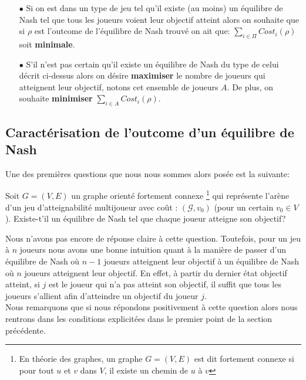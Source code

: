 \begin{itemize}
	\item[$\bullet$] Si on est dans un type de jeu tel qu'il existe (au moins) un équilibre de Nash tel que tous les joueurs voient leur objectif atteint alors on souhaite que si $\rho$ est l'outcome de l'équilibre de Nash trouvé on ait que:
	$ \sum_{i \in \Pi} Cost_i(\rho)$ soit \textbf{minimale}.
	\item[$\bullet$]S'il n'est pas certain qu'il existe un équilibre de Nash du type de celui décrit ci-dessus alors on désire \textbf{maximiser} le nombre de joueurs qui atteignent leur objectif, notons cet ensemble de joueurs $A$. De plus, on souhaite \textbf{minimiser} $\sum_{i \in A} Cost_i(\rho)$.
\end{itemize}

\subsection{Caractérisation de l'outcome d'un équilibre de Nash}

Une des premières questions que nous nous sommes alors posée est la suivante:
\begin{qst}
	\label{qst:1}
	
	Soit $G = (V,E)$ un graphe orienté fortement connexe \footnote{En théorie des graphes, un graphe $G = (V,E)$ est dit fortement connexe si pour tout $u$ et $v$ dans $V$, il existe un chemin de $u$ à $v$} qui représente l'arène d'un jeu d'atteignabilité multijoueur avec coût : $(\mathcal{G},v_{0})$ (pour un certain $v_{0} \in V$).
Existe-t'il un équilibre de Nash tel que chaque joueur atteigne son objectif?

\end{qst}

Nous n'avons pas encore de réponse claire à cette question. Toutefois, pour un jeu à $n$ joueurs nous avons une bonne intuition quant à la manière de passer d'un équilibre de Nash où $n-1$ joueurs atteignent leur objectif à un équilibre de Nash où $n$ joueurs atteignent leur objectif. En effet, à partir du dernier état objectif atteint, si $j$ est le joueur qui n'a pas atteint son objectif, il suffit que tous les joueurs s'allient afin d'atteindre un objectif du joueur $j$.\\

Nous remarquons que si nous répondons positivement à cette question alors nous rentrons dans les conditions explicitées dans le premier point de la section précédente.




